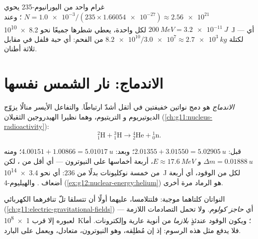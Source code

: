 \begin{example}\label{ex:g12:nuclear-energy:gram}
غرام واحد من اليورانيوم-235 يحوي
$N = \num{1.0e-3} / (235 \times \num{1.66054e-27}) \approx \num{2.56e21}$
؛ وعند $\qty{200}{MeV} = \qty{3.2e-11}{J}$ لكل واحدة، يعطي شطرها جميعًا
نحو \qty{8.2e10}{J} --- أي  لكتلة $\num{8.2e10} /
\num{3.0e7} \approx \qty{2.7e3}{kg}$ من الفحم: أي حبة فلفل في مقابل ثلاثة أطنان.
\end{example}

\section{الاندماج: نار الشمس نفسها}

\begin{definition}[الاندماج]\label{def:g12:nuclear-energy:fusion}
\emph{الاندماج} هو دمج نواتين خفيفتين في  أثقل
أشدّ ارتباطًا. والتفاعل الأيسر منالًا يزوّج الديوتيريوم و
التريتيوم، وهما نظيرا الهيدروجين الثقيلان (\cref{ch:g11:nucleus-radioactivity}):
\[
{}^{2}_{1}\mathrm{H} + {}^{3}_{1}\mathrm{H} \longrightarrow
{}^{4}_{2}\mathrm{He} + {}^{1}_{0}\mathrm{n}.
\]
\end{definition}

\begin{example}[D--T، موزونًا]\label{ex:g12:nuclear-energy:dt}
قبل: $2.01355 + 3.01550 = \qty{5.02905}{u}$؛ وبعد:
$4.00151 + 1.00866 = \qty{5.01017}{u}$؛ ومنه $\Delta m = \qty{0.01888}{u}$ و
$E \approx \qty{17.6}{MeV}$، أربعة أخماسها على النيوترون --- أي أقل من
، لكن من خمسة نوكليونات بدلًا من $236$: أي نحو \qty{3.4e14}{J} لكل
 من الوقود، أي أربعة أضعاف . والهيليوم-4
(\cref{ex:g12:nuclear-energy:helium}) هو الرماد مرة أخرى.
\end{example}

\begin{definition}\label{def:g12:nuclear-energy:barrier}
النواتان كلتاهما موجبة: فلتتلامسا، عليهما أولًا أن تتسلقا تلّ
تنافرهما الكهربائي (\cref{ch:g11:electric-gravitational-fields}) --- أي
\emph{حاجز كولوم}. ولا تحمل التصادمات  اللازمة
لعبوره إلا قرب \qty{1e8}{K}؛ ويكون الوقود عندئذٍ
\emph{بلازما} من أنوية عارية وإلكترونات. أما  فلا يدفع
مثل هذه الرسوم: إذ إن مُطلِقه، وهو النيوترون، متعادل، ويعمل على البارد.
\end{definition}

